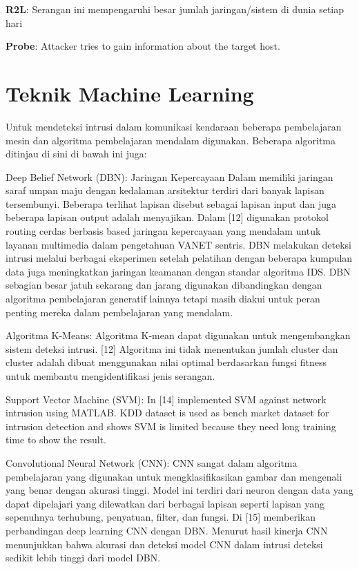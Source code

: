 \documentclass[conference]{IEEEtran}
\begin{document}
\textbf{R2L}: Serangan ini mempengaruhi besar
jumlah jaringan/sistem di dunia setiap hari

\textbf{Probe}: Attacker tries to gain information about 
the target host.

\section{Teknik Machine Learning}
Untuk mendeteksi intrusi dalam komunikasi kendaraan beberapa
pembelajaran mesin dan algoritma pembelajaran mendalam digunakan.
Beberapa algoritma ditinjau di sini di bawah ini juga:

Deep Belief Network (DBN): Jaringan Kepercayaan Dalam
memiliki jaringan saraf umpan maju dengan kedalaman
arsitektur terdiri dari banyak lapisan tersembunyi. Beberapa terlihat
lapisan disebut sebagai lapisan input dan juga beberapa lapisan output adalah
menyajikan. Dalam [12]\cite{olusola2010analysis} digunakan protokol routing cerdas berbasis based
jaringan kepercayaan yang mendalam untuk layanan multimedia dalam pengetahuan
VANET sentris. DBN melakukan deteksi intrusi
melalui berbagai eksperimen setelah pelatihan dengan beberapa
kumpulan data juga meningkatkan jaringan keamanan dengan standar
algoritma IDS. DBN sebagian besar jatuh sekarang dan
jarang digunakan dibandingkan dengan algoritma pembelajaran generatif lainnya
tetapi masih diakui untuk peran penting mereka dalam pembelajaran yang mendalam.

Algoritma K-Means: Algoritma K-mean dapat digunakan
untuk mengembangkan sistem deteksi intrusi. [12]\cite{zhang2018intelligent} Algoritma ini
tidak menentukan jumlah cluster dan cluster adalah
dibuat menggunakan nilai optimal berdasarkan fungsi fitness untuk
membantu mengidentifikasi jenis serangan.

Support Vector Machine (SVM): In [14]\cite{sukumar2018network} implemented 
SVM against network intrusion using MATLAB. KDD 
dataset is used as bench market dataset for intrusion 
detection and shows SVM is limited because they need long 
training time to show the result. 

Convolutional Neural Network (CNN): CNN sangat dalam
algoritma pembelajaran yang digunakan untuk mengklasifikasikan gambar dan mengenali
yang benar dengan akurasi tinggi. Model ini terdiri dari
neuron dengan data yang dapat dipelajari yang dilewatkan dari berbagai lapisan
seperti lapisan yang sepenuhnya terhubung, penyatuan, filter, dan fungsi. Di
[15]\cite{lahre2013analyze} memberikan perbandingan deep learning CNN dengan DBN.
Menurut hasil kinerja CNN menunjukkan bahwa
akurasi dan deteksi model CNN dalam intrusi
deteksi sedikit lebih tinggi dari model DBN.
\end{document}
